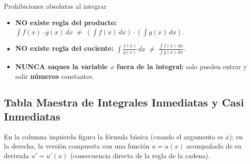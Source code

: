 \documentclass[10pt,a4paper]{article}
\begin{document}
\begin{trampabox}{Prohibiciones absolutas al integrar}
\begin{itemize}\itemsep 1.5pt
  \item \textbf{NO existe regla del producto:} $\displaystyle \int f(x)\cdot g(x)\,dx \;\neq\; \left(\int f(x)\,dx\right)\cdot\left(\int g(x)\,dx\right)$.
  \item \textbf{NO existe regla del cociente:} $\displaystyle \int \frac{f(x)}{g(x)}\,dx \;\neq\; \frac{\int f(x)\,dx}{\int g(x)\,dx}$.
  \item \textbf{NUNCA saques la variable $x$ fuera de la integral:} solo pueden entrar y salir \textbf{números} constantes.
\end{itemize}
\end{trampabox}

\newpage
\subsection{Tabla Maestra de Integrales Inmediatas y Casi Inmediatas}

En la columna izquierda figura la fórmula básica (cuando el argumento es $x$); en la derecha, la versión compuesta con una función $u = u(x)$ acompañada de su derivada $u' = u'(x)$ (consecuencia directa de la regla de la cadena).
\end{document}
